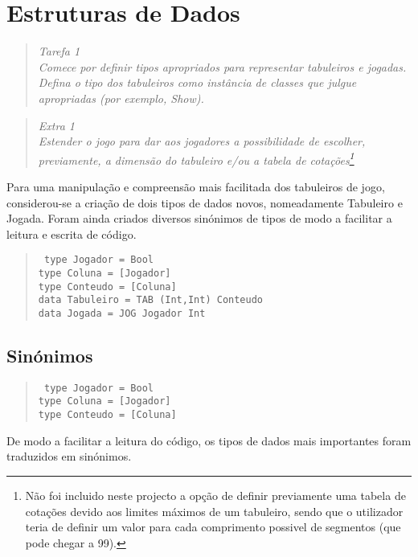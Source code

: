 \documentclass[a4paper,titlepage]{scrreprt}
\begin{document}
\chapter{Estruturas de Dados}
	\begin{quote}
		\begin{center}
			{\it
			Tarefa 1\\
			Comece por definir tipos apropriados para representar tabuleiros e jogadas. Defina o tipo dos tabuleiros como
			instância de classes que julgue apropriadas (por exemplo, Show).
			}
		\end{center}
	\end{quote}
	\begin{quote}
		\begin{center}
			{\it
			Extra 1\\
			Estender o jogo para dar aos jogadores a possibilidade de escolher, previamente, a
			dimensão do tabuleiro e/ou a tabela de cotações\footnote{Não foi incluido neste projecto a opção de definir previamente
			uma tabela de cotações devido aos limites máximos de um tabuleiro, sendo que o utilizador teria de definir um valor para
			cada comprimento possivel de segmentos (que pode chegar a 99).}
			}
		\end{center}
	\end{quote}
Para uma manipulação e compreensão mais facilitada dos tabuleiros de jogo, considerou-se a criação de dois tipos de dados novos,
nomeadamente Tabuleiro e Jogada. Foram ainda criados diversos sinónimos de tipos de modo a facilitar a leitura e escrita de
código.
	\begin{quote}
			{\tt
			type Jogador = Bool\\
			type Coluna = [Jogador]\\
			type Conteudo = [Coluna]\\
			\newline
			data Tabuleiro = TAB (Int,Int) Conteudo\\
			data Jogada = JOG Jogador Int\\
			}
	\end{quote}
	\section{Sinónimos}
		\begin{quote}
			{\tt
			type Jogador = Bool\\
			type Coluna = [Jogador]\\
			type Conteudo = [Coluna]\\
			}
		\end{quote}
		De modo a facilitar a leitura do código, os tipos de dados mais importantes foram traduzidos em sinónimos.
		
\end{document}
